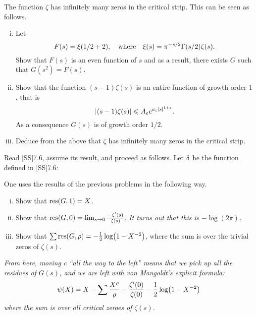 \documentclass[12pt]{memoir}
\begin{document}
\begin{Ej}
    The function $\zeta$ has infinitely many zeros in the critical strip. This can be seen as follows.
    \begin{enumerate}[i)]
        \item Let 
        $$F(s)=\xi(1/2+2),\quad\text{where}\quad\xi(s)=\pi^{-s/2}\Gamma(s/2)\zeta(s).$$
        Show that $F(s)$ is an even function of $s$ and as a result, there exists $G$ such that $G(s^2)=F(s)$.
        \item Show that the function $(s-1)\zeta(s)$ is an entire function of growth order $1$, that is 
        $$|(s-1)\zeta(s)|\leqslant A_\varepsilon e^{a_\varepsilon|s|^{1+\varepsilon}}.$$
        As a consequence $G(s)$ is of growth order $1/2$.
        \item Deduce from the above that $\zeta$ has infinitely many zeros in the critical strip.
    \end{enumerate}
\end{Ej}

\begin{ptcbr}
\end{ptcbr}

\begin{Ej}
    Read [SS]7.6, assume its result, and proceed as follows. Let $\delta$ be the function defined in [SS]7.6:
\end{Ej}

\begin{ptcbr}
\end{ptcbr}

\begin{Ej}
    One uses the results of the previous problems in the following way.
    \begin{enumerate}[i)]
        \item Show that $\operatorname*{res}(G,1)=X$. 
        \item Show that $\operatorname*{res}(G,0)=\lim_{s\to 0}\frac{-\zeta'(s)}{\zeta(s)}$. \emph{It turns out that this is $-\log(2\pi)$.}
        \item Show that $\sum\operatorname*{res}(G,\rho)=-\frac{1}{2}\log(1-X^{-2})$, where the sum is over the trivial zeros of $\zeta(s)$.
    \end{enumerate}
    \emph{From here, moving c “all the way to the left” means that we pick up all the residues of $G(s)$, and we
    are left with von Mangoldt's explicit formula:}
    $$\psi(X)=X-\sum\frac{X^\rho}{\rho}-\frac{\zeta'(0)}{\zeta(0)}-\half\log(1-X^{-2})$$
    \emph{where the sum is over all critical zeroes of $\zeta(s)$.}
\end{Ej}
\end{document}

